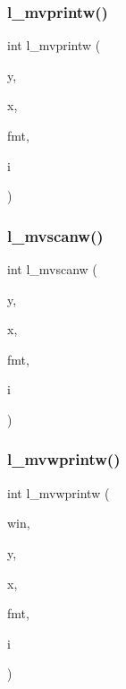 \mbox{\label{C-macros_8c_a958fd7e4d13c3ae6f4a8c249309d6b10}} 
\subsubsection{\texorpdfstring{l\+\_\+mvprintw()}{l\_mvprintw()}}
{\footnotesize\ttfamily int l\+\_\+mvprintw (\begin{DoxyParamCaption}\item[{int}]{y,  }\item[{int}]{x,  }\item[{const char $\ast$}]{fmt,  }\item[{long}]{i }\end{DoxyParamCaption})}

\mbox{\label{C-macros_8c_a27ab41c1f51bd6ad8029350446a577ea}} 
\subsubsection{\texorpdfstring{l\+\_\+mvscanw()}{l\_mvscanw()}}
{\footnotesize\ttfamily int l\+\_\+mvscanw (\begin{DoxyParamCaption}\item[{int}]{y,  }\item[{int}]{x,  }\item[{char $\ast$}]{fmt,  }\item[{long $\ast$}]{i }\end{DoxyParamCaption})}

\mbox{\label{C-macros_8c_a5daab34ebd2f1b9e9c30e70f68b9f634}} 
\subsubsection{\texorpdfstring{l\+\_\+mvwprintw()}{l\_mvwprintw()}}
{\footnotesize\ttfamily int l\+\_\+mvwprintw (\begin{DoxyParamCaption}\item[{W\+I\+N\+D\+OW $\ast$}]{win,  }\item[{int}]{y,  }\item[{int}]{x,  }\item[{const char $\ast$}]{fmt,  }\item[{long}]{i }\end{DoxyParamCaption})}

